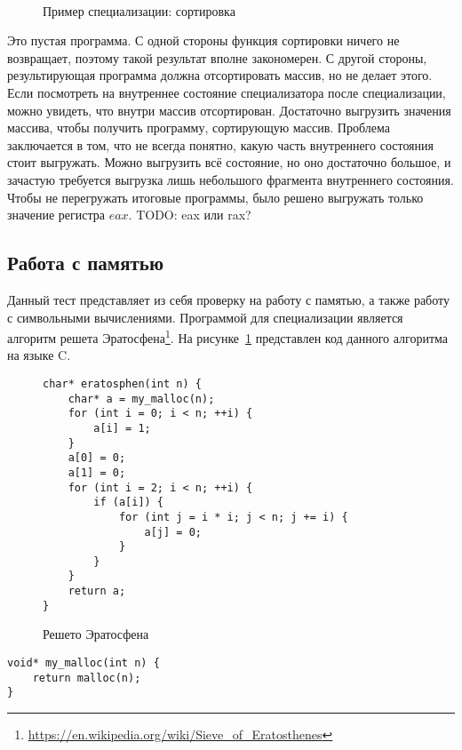 \begin{figure}[!t]
\centering
{} \\
\caption{Пример специализации: сортировка}
\end{figure}


Это пустая программа. С одной стороны функция сортировки ничего не возвращает, поэтому такой результат вполне закономерен. С другой стороны, результирующая программа должна отсортировать массив, но не делает этого. Если посмотреть на внутреннее состояние специализатора после специализации, можно увидеть, что внутри массив отсортирован. Достаточно выгрузить значения массива, чтобы получить программу, сортирующую массив. Проблема заключается в том, что не всегда понятно, какую часть внутреннего состояния стоит выгружать. Можно выгрузить всё состояние, но оно достаточно большое, и зачастую требуется выгрузка лишь небольшого фрагмента внутреннего состояния. Чтобы не перегружать итоговые программы, было решено выгружать только значение регистра $eax$. {\color{red}TODO: eax или rax?}

\subsection{ Работа с памятью}

Данный тест представляет из себя проверку на работу с памятью, а также работу с символьными вычислениями. Программой для специализации является алгоритм решета Эратосфена\footnote{\url{https://en.wikipedia.org/wiki/Sieve_of_Eratosthenes}}. На рисунке~\ref{fig:era} представлен код данного алгоритма на языке \textsf{C}.
\begin{figure}[t]
\begin{lstlisting}[xleftmargin = 20pt]
char* eratosphen(int n) {
    char* a = my_malloc(n);
    for (int i = 0; i < n; ++i) {
        a[i] = 1;
    }
    a[0] = 0;
    a[1] = 0;
    for (int i = 2; i < n; ++i) {
        if (a[i]) {
            for (int j = i * i; j < n; j += i) {
                a[j] = 0;
            }
        }
    }
    return a;
}
\end{lstlisting}
\caption{ Решето Эратосфена}
\label{fig:era}
\end{figure}

\newsavebox\boxel
\begin{lrbox}{\boxel}
\begin{lstlisting}[xleftmargin = 20pt]
void* my_malloc(int n) {
    return malloc(n);
}
\end{lstlisting}
\end{lrbox}

